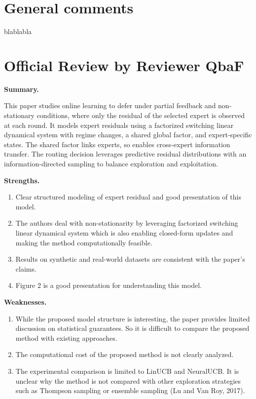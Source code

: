 \section{General comments}
blablabla



\section*{Official Review by Reviewer QbaF}

\textbf{Summary.}

This paper studies online learning to defer under partial feedback and non-stationary conditions, where only the residual of the selected expert is observed at each round. It models expert residuals using a factorized switching linear dynamical system with regime changes, a shared global factor, and expert-specific states. The shared factor links experts, so enables cross-expert information transfer. The routing decision leverages predictive residual distributions with an information-directed sampling to balance exploration and exploitation.

\textbf{Strengths.}
\begin{enumerate}
    \item Clear structured modeling of expert residual and good presentation of this model.
    \item The authors deal with non-stationarity by leveraging factorized switching linear dynamical system which is also enabling closed-form updates and making the method computationally feasible.
    \item Results on synthetic and real-world datasets are consistent with the paper's claims.
    \item Figure 2 is a good presentation for understanding this model.
\end{enumerate}

\textbf{Weaknesses.}
\begin{enumerate}
    \item While the proposed model structure is interesting, the paper provides limited discussion on statistical guarantees. So it is difficult to compare the proposed method with existing approaches.
    \item The computational cost of the proposed method is not clearly analyzed.
    \item The experimental comparison is limited to LinUCB and NeuralUCB. It is unclear why the method is not compared with other exploration strategies such as Thompson sampling or ensemble sampling (Lu and Van Roy, 2017).
\end{enumerate}

